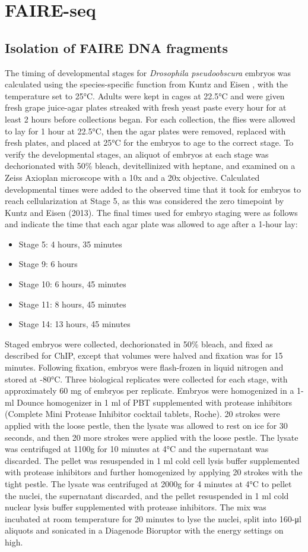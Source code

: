 \section{FAIRE-seq}
\subsection{Isolation of FAIRE DNA fragments}
The timing of developmental stages for \emph{Drosophila pseudoobscura} embryos was calculated using the species-specific function from Kuntz and Eisen \citet{kuntz_native_2013}, with the temperature set to 25°C. Adults were kept in cages at 22.5°C and were given fresh grape juice-agar plates streaked with fresh yeast paste every hour for at least 2 hours before collections began. For each collection, the flies were allowed to lay for 1 hour at 22.5°C, then the agar plates were removed, replaced with fresh plates, and placed at 25°C for the embryos to age to the correct stage. To verify the developmental stages, an aliquot of embryos at each stage was dechorionated with 50\% bleach, devitellinized with heptane, and examined on a Zeiss Axioplan microscope with a 10x and a 20x objective. Calculated developmental times were added to the observed time that it took for embryos to reach cellularization at Stage 5, as this was considered the zero timepoint by Kuntz and Eisen (2013). The final times used for embryo staging were as follows and indicate the time that each agar plate was allowed to age after a 1-hour lay:
\begin{itemize}
	\item Stage 5: 4 hours, 35 minutes
	\item Stage 9: 6 hours
	\item Stage 10: 6 hours, 45 minutes
	\item Stage 11: 8 hours, 45 minutes
	\item Stage 14: 13 hours, 45 minutes
\end{itemize}
Staged embryos were collected, dechorionated in 50\% bleach, and fixed as described for ChIP, except that volumes were halved and fixation was for 15 minutes. Following fixation, embryos were flash-frozen in liquid nitrogen and stored at -80°C. Three biological replicates were collected for each stage, with approximately 60 mg of embryos per replicate. Embryos were homogenized in a 1-ml Dounce homogenizer in 1 ml of PBT supplemented with protease inhibitors (Complete Mini Protease Inhibitor cocktail tablets, Roche). 20 strokes were applied with the loose pestle, then the lysate was allowed to rest on ice for 30 seconds, and then 20 more strokes were applied with the loose pestle. The lysate was centrifuged at 1100g for 10 minutes at 4°C and the supernatant was discarded. The pellet was resuspended in 1 ml cold cell lysis buffer supplemented with protease inhibitors and further homogenized by applying 20 strokes with the tight pestle. The lysate was centrifuged at 2000g for 4 minutes at 4°C to pellet the nuclei, the supernatant discarded, and the pellet resuspended in 1 ml cold nuclear lysis buffer supplemented with protease inhibitors. The mix was incubated at room temperature for 20 minutes to lyse the nuclei, split into 160-μl aliquots and sonicated in a Diagenode Bioruptor with the energy settings on high. 
